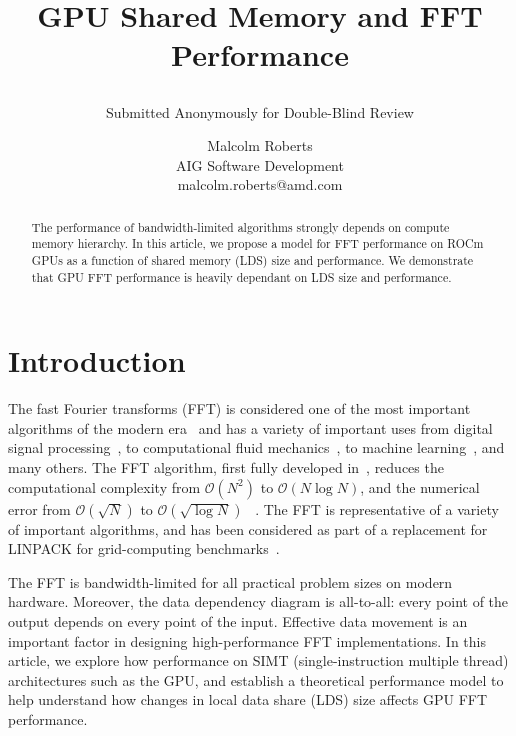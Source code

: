 \documentclass[blind]{gtac}
\title{GPU Shared Memory and FFT Performance \subtitle{Submitted Anonymously for Double-Blind Review}}
\author{Malcolm Roberts \\
AIG Software Development \\
malcolm.roberts@amd.com}
\def\({\left(}
\def\){\right)}
\begin{document}
\maketitle %
\vspace*{-1.2in} %


\pagestyle{fancy}
\fancyhf{} %
\cfoot{\thepage} %
\renewcommand{\headrulewidth}{0pt} %

\thispagestyle{fancy}
\begin{abstract}
The performance of bandwidth-limited algorithms strongly depends on
compute memory hierarchy.  In this article, we propose a model for FFT
performance on ROCm GPUs as a function of shared memory (LDS) size and
performance.  We demonstrate that GPU FFT performance is heavily
dependant on LDS size and performance.
\end{abstract}


\section{Introduction}

The fast Fourier transforms (FFT) is considered one of the most
important algorithms of the modern era~\cite{strang1994wavelets} and
has a variety of important uses from digital signal
processing~\cite{sorensen1990efficient}, to computational fluid
mechanics~\cite{chatterjee2018scaling}, to machine
learning~\cite{mathieu2013fast}, and many others.  The FFT algorithm,
first fully developed in~\cite{cooley1965algorithm}, reduces the
computational complexity from $\mathcal{O}\(N^2\)$ to
$\mathcal{O}\(N\log{}N\)$, and the numerical error from
$\mathcal{O}\(\sqrt{N}\)$ to $\mathcal{O}\(\sqrt{\log{}N}\)$
~\cite{gentleman1966fast}.  The FFT is representative of a variety of
important algorithms, and has been considered as part of a replacement
for LINPACK for grid-computing benchmarks~\cite{hpcchallenge}.

The FFT is bandwidth-limited for all practical problem sizes on modern
hardware.  Moreover, the data dependency diagram is all-to-all: every
point of the output depends on every point of the input.  Effective
data movement is an important factor in designing high-performance FFT
implementations.  In this article, we explore how performance on SIMT
(single-instruction multiple thread) architectures such as the GPU,
and establish a theoretical performance model to help understand how
changes in local data share (LDS) size affects GPU FFT performance.
\end{document}
